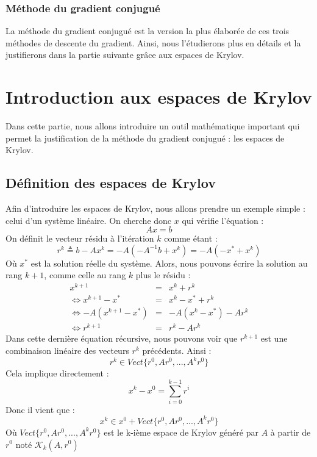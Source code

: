 \subsubsection{Méthode du gradient conjugué}
La méthode du gradient conjugué est la version la plus élaborée de ces trois méthodes de descente du gradient. Ainsi, nous l'étudierons plus en détails et la justifierons dans la partie suivante grâce aux espaces de Krylov.
\section{Introduction aux espaces de Krylov}
Dans cette partie, nous allons introduire un outil mathématique important qui permet la justification de la méthode du gradient conjugué : les espaces de Krylov. 
\subsection{Définition des espaces de Krylov}
Afin d'introduire les espaces de Krylov, nous allons prendre un exemple simple : celui d'un système linéaire. On cherche donc $x$ qui vérifie l'équation : 
\begin{equation}
Ax = b
\end{equation}
On définit le vecteur résidu à l'itération $k$ comme étant : 
\begin{equation}
r^k \triangleq b - Ax^k = -A ( - A^{-1}b + x^k) = -A (- x^* + x^k)
\end{equation}
Où $x^*$ est la solution réelle du système. Alors, nous pouvons écrire la solution au rang $k+1$, comme celle au rang $k$ plus le résidu : 
\begin{eqnarray}
x^{k+1} &=& x^k + r^k\\
\Leftrightarrow x^{k+1} - x^* &=& x^k - x^* + r^k\\
\Leftrightarrow -A( x^{k+1} - x^*) &=& -A(x^k - x^*) - Ar^k\\
\Leftrightarrow r^{k+1} &=& r^k - Ar^k
\end{eqnarray}
Dans cette dernière équation récursive, nous pouvons voir que $r^{k+1}$ est une combinaison linéaire des vecteurs $r^k$ précédents. Ainsi :
\begin{equation}
r^k \in Vect\{r^0, Ar^0, ..., A^kr^0\}
\end{equation}
Cela implique directement : 
\begin{equation}
x^k - x^0 = \sum_{i = 0}^{k-1}r^i
\end{equation}
Donc il vient que : 
\begin{equation}
x^k \in x^0 + Vect\{r^0, Ar^0, ..., A^kr^0\}
\end{equation}
Où $Vect\{r^0, Ar^0, ..., A^kr^0\}$ est le k-ième espace de Krylov généré par $A$ à partir de $r^0$ noté $\mathcal{K}_k(A, r^0)$
